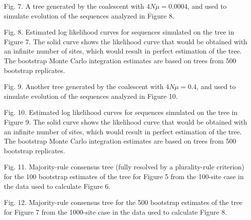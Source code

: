 {Fig. 7.  A tree generated by the coalescent with $4N\mu = 0.0004$, and used to
simulate evolution of the sequences analyzed in Figure 8.
\bigskip

Fig. 8.  Estimated log likelihood curves for sequences simulated on the tree
in Figure 7.  The solid curve shows the likelihood curve that would be obtained
with an infinite number of sites, which would result in perfect estimation
of the tree.  The bootstrap Monte Carlo integration estimates are based on
trees from 500 bootstrap replicates.
\bigskip

Fig. 9.  Another tree generated by the coalescent with $4N\mu = 0.4$, and used
to simulate evolution of the sequences analyzed in Figure 10.
\bigskip

Fig. 10.  Estimated log likelihood curves for sequences simulated on the tree
in Figure 9.  The solid curve shows the likelihood curve that would be obtained
with an infinite number of sites, which would result in perfect estimation
of the tree.  The bootstrap Monte Carlo integration estimates are based on
trees from 500 bootstrap replicates.
\bigskip

Fig. 11.  Majority-rule consensus tree (fully resolved by a plurality-rule
criterion) for the 100 bootstrap estimates of the tree for Figure 5 from the
100-site case in the data used to calculate Figure 6.
\bigskip

Fig. 12.  Majority-rule consensus tree for the 500 bootstrap estimates of the
tree for Figure 7 from the
1000-site case in the data used to calculate Figure 8.
\bigskip
}


